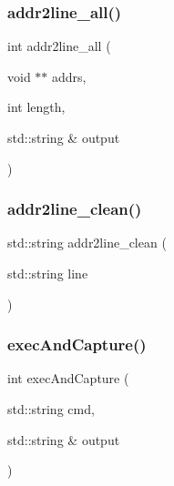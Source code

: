 \mbox{\label{namespacestacktrace_a179c9d83db84c7fa809a4ab21d580d4b}} 
\subsubsection{\texorpdfstring{addr2line\+\_\+all()}{addr2line\_all()}\hspace{0.1cm}{\footnotesize\ttfamily [2/2]}}
{\footnotesize\ttfamily int addr2line\+\_\+all (\begin{DoxyParamCaption}\item[{void $\ast$$\ast$}]{addrs,  }\item[{int}]{length,  }\item[{std\+::string \&}]{output }\end{DoxyParamCaption})}

\mbox{\label{namespacestacktrace_a053d4a96859b0cc3ef59c8126a6d9853}} 
\subsubsection{\texorpdfstring{addr2line\+\_\+clean()}{addr2line\_clean()}}
{\footnotesize\ttfamily std\+::string addr2line\+\_\+clean (\begin{DoxyParamCaption}\item[{std\+::string}]{line }\end{DoxyParamCaption})}

\mbox{\label{namespacestacktrace_a0ac07ad3feb21bf6bb2f3728b1ff569d}} 
\subsubsection{\texorpdfstring{exec\+And\+Capture()}{execAndCapture()}}
{\footnotesize\ttfamily int exec\+And\+Capture (\begin{DoxyParamCaption}\item[{std\+::string}]{cmd,  }\item[{std\+::string \&}]{output }\end{DoxyParamCaption})}

